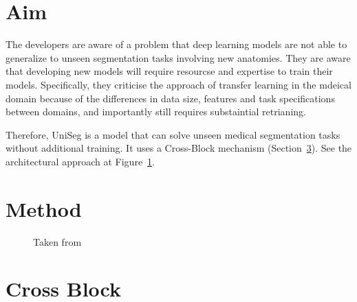 \documentclass[11pt]{article}
\begin{document}


\tableofcontents

\clearpage

\section{Aim}

The developers are aware of a problem that deep learning models are not able to generalize to unseen segmentation tasks involving new anatomies. They are aware that developing new models will require resourcse and expertise to train their models. Specifically, they criticise the approach of transfer learning in the mdeical domain because of the differences in data size, features and task specifications between domains, and importantly still requires substaintial retrianing. 

\vspace{1em}

Therefore, UniSeg is a model that can solve unseen medical segmentation tasks without additional training. It uses a Cross-Block mechanism (Section~\ref{sec:cross-block}). See the architectural approach at Figure~\ref{fig:arch-comparison}.

\section{Method}

\begin{figure}[H]
    \centering
    \caption{Taken from~\cite{universeg}}\label{fig:arch-comparison}
\end{figure}



\section{Cross Block} \label{sec:cross-block}

\printbibliography
\end{document}
